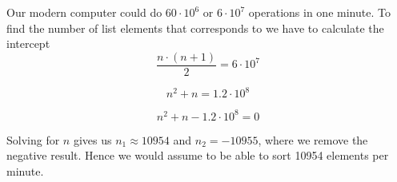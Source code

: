\documentclass[11pt]{article}
\begin{document}
Our modern computer could do $60\cdot 10^6$ or $6\cdot 10^7$ operations in one minute. To find the number of list elements that corresponds to we have to calculate the intercept
\begin{equation*}
    \frac{n\cdot (n+1)}{2} = 6\cdot 10^7
\end{equation*}

\begin{equation*}
    n^2 + n = 1.2\cdot 10^8
\end{equation*}

\begin{equation*}
    n^2 + n - 1.2\cdot 10^8 = 0
\end{equation*}

Solving for $n$ gives us $n_1 \approx 10954$ and $n_2 = -10955$, where we remove the negative result. Hence we would assume to be able to sort 10954 elements per minute.
\end{document}
